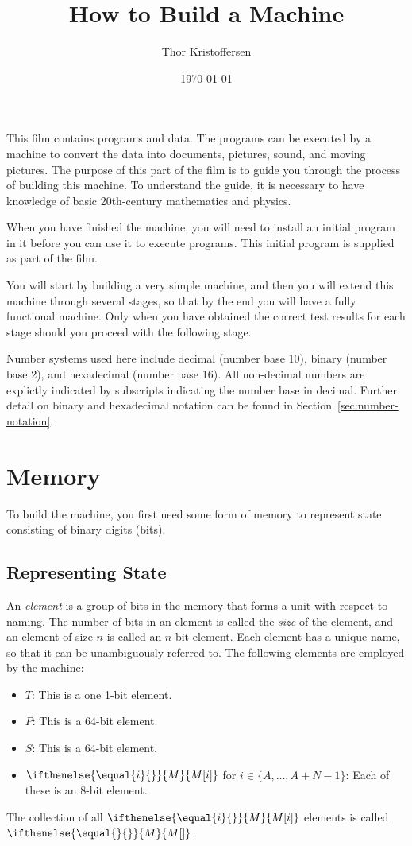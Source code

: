 \documentclass[a4paper,12pt]{article}
\author{Thor Kristoffersen}
\date{\today}
\title{How to Build a Machine}
\newcommand{\MEM}[1]{\ifthenelse{\equal{#1}{}}{M}{M[#1]}}
\newcommand{\PC}{P}
\newcommand{\SP}{S}
\newcommand{\TERM}{T}
\newcommand{\range}[2]{\{#1,\ldots,#2\}}
\theoremstyle{definition}
\begin{document}
\maketitle

\noindent
This film contains programs and data.
The programs can be executed by a machine to convert the data into documents, pictures, sound, and moving pictures.
The purpose of this part of the film is to guide you through the process of building this machine.
To understand the guide, it is necessary to have knowledge of basic 20th-century mathematics and physics.

When you have finished the machine, you will need to install an initial program in it before you can use it to execute programs.
This initial program is supplied as part of the film.

You will start by building a very simple machine, and then you will extend this machine through several stages, so that by the end you will have a fully functional machine.
Only when you have obtained the correct test results for each stage should you proceed with the following stage.

Number systems used here include decimal (number base 10), binary (number base 2), and hexadecimal (number base 16).
All non-decimal numbers are explictly indicated by subscripts indicating the number base in decimal.
Further detail on binary and hexadecimal notation can be found in Section~\ref{sec:number-notation}.

\section{Memory}

To build the machine, you first need some form of memory to represent state consisting of binary digits (bits).

\subsection{Representing State}

An \emph{element} is a group of bits in the memory that forms a unit with respect to naming.
The number of bits in an element is called the \emph{size} of the element, and an element of size $n$ is called an $n$-bit element.
Each element has a unique name, so that it can be unambiguously referred to.
The following elements are employed by the machine:
\begin{itemize}
\item $\TERM$: This is a one 1-bit element.
\item $\PC$: This is a 64-bit element.
\item $\SP$: This is a 64-bit element.
\item $\MEM{i}$ for $i \in \range{A}{A+N-1}$: Each of these is an 8-bit element.
\end{itemize}
The collection of all $\MEM{i}$ elements is called $\MEM{}$.
\end{document}
